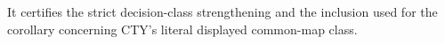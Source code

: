 It certifies the strict decision-class strengthening and the inclusion used for the corollary concerning CTY's literal displayed common-map class.
